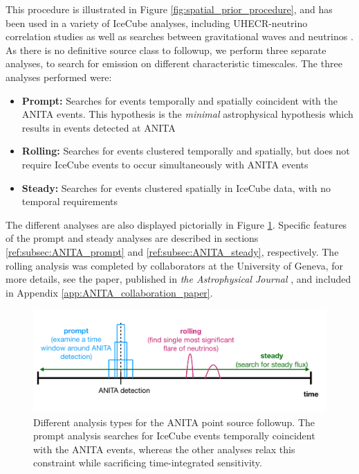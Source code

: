 This procedure is illustrated in Figure \ref{fig:spatial_prior_procedure}, and has been used in a variety of IceCube analyses, including UHECR-neutrino correlation studies \cite{Schumacher:2019qdx} as well as searches between gravitational waves and neutrinos \cite{Hussain:2019xzb}. As there is no definitive source class to followup, we perform three separate analyses, to search for emission on different characteristic timescales. The three analyses performed were:
\begin{itemize}
    \item \textbf{Prompt:} Searches for events temporally and spatially coincident with the ANITA events. This hypothesis is the \textit{minimal} astrophysical hypothesis which results in events detected at ANITA
    \item \textbf{Rolling:} Searches for events clustered temporally and spatially, but does not require IceCube events to occur simultaneously with ANITA events
    \item \textbf{Steady:} Searches for events clustered spatially in IceCube data, with no temporal requirements
\end{itemize}
The different analyses are also displayed pictorially in Figure \ref{fig:ANITA:analysis_types}. Specific features of the prompt and steady analyses are described in sections \ref{ref:subsec:ANITA_prompt} and \ref{ref:subsec:ANITA_steady}, respectively. The rolling analysis was completed by collaborators at the University of Geneva, for more details, see the paper, published in \textit{the Astrophysical Journal} \citep{ANITACOLLABPAPER}, and included in Appendix \ref{app:ANITA_collaboration_paper}. 

\begin{figure}
    \centering
    \includegraphics[width=.95\linewidth]{figures/ANITA/ANITA_different_analyses.png}
    \caption[ANITA Analysis types]{Different analysis types for the ANITA point source followup. The prompt analysis searches for IceCube events temporally coincident with the ANITA events, whereas the other analyses relax this constraint while sacrificing time-integrated sensitivity.}
    \label{fig:ANITA:analysis_types}
\end{figure}

